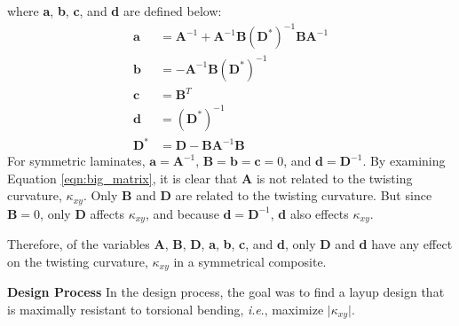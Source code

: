 \documentclass[12 pt]{article}
\newcommand{\ie}{\textit{i}.\textit{e}., }
\begin{document}
where \textbf{a}, \textbf{b}, \textbf{c}, and \textbf{d} are defined below:
\begin{align*}
	\textbf{a}&=\textbf{A}^{-1}+\textbf{A}^{-1}\textbf{B}(\textbf{D}^*)^{-1}\textbf{B}\textbf{A}^{-1}\\
	\textbf{b}&=-\textbf{A}^{-1}\textbf{B}(\textbf{D}^*)^{-1}\\
	\textbf{c}&=\textbf{B}^T\\
	\textbf{d}&=(\textbf{D}^*)^{-1}\\
	\textbf{D}^*&=\textbf{D}-\textbf{B}\textbf{A}^{-1}\textbf{B}
\end{align*}
For symmetric laminates, $\textbf{a}=\textbf{A}^{-1}$, $\textbf{B}=\textbf{b}=\textbf{c}=0$, and $\textbf{d}=\textbf{D}^{-1}$. By examining Equation \ref{eqn:big_matrix}, it is clear that \textbf{A} is not related to the twisting curvature, $\kappa_{xy}$. Only \textbf{B} and \textbf{D} are related to the twisting curvature. But since $\textbf{B}=0$, only \textbf{D} affects $\kappa_{xy}$, and because $\textbf{d}=\textbf{D}^{-1}$, \textbf{d} also effects $\kappa_{xy}$.

Therefore, of the variables \textbf{A}, \textbf{B}, \textbf{D}, \textbf{a}, \textbf{b}, \textbf{c}, and \textbf{d}, only \textbf{D} and \textbf{d} have any effect on the twisting curvature, $\kappa_{xy}$ in a symmetrical composite.

\textbf{Design Process}
In the design process, the goal was to find a layup design that is maximally resistant to torsional bending, \ie maximize $\lvert\kappa_{xy}\rvert$.
\end{document}
